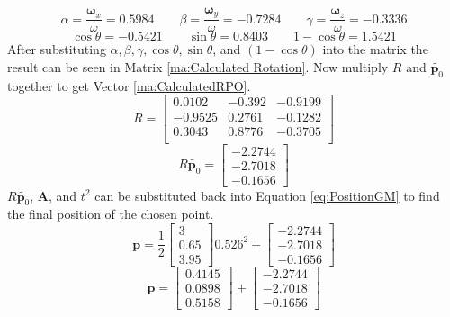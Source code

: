\begin{equation}\label{var:alphabetagamma}
	\alpha = \frac{\boldsymbol\omega_{x}}{\omega} = 0.5984
	\qquad
	\beta = \frac{\boldsymbol\omega_{y}}{\omega} = -0.7284
	\qquad
	\gamma = \frac{\boldsymbol\omega_{z}}{\omega} = -0.3336
\end{equation}
\begin{equation}\label{var:cs1-c}
	\cos\theta = -0.5421
	\qquad
	\sin\theta = 0.8403
	\qquad
	1-\cos\theta = 1.5421
\end{equation}
After substituting $\alpha, \beta, \gamma,\cos\theta, \sin\theta$, and $(1-\cos\theta)$ into the matrix the result can be seen in Matrix \ref{ma:Calculated Rotation}. Now multiply $R$ and $\tilde{\mathbf{p}_{0}}$ together to get Vector \ref{ma:CalculatedRPO}.
\begin{equation}\label{ma:Calculated Rotation}
	R = 
		\begin{bmatrix}
		   0.0102 & 
		  -0.392 & 
		  -0.9199 \\
		  
		  -0.9525 & 
		   0.2761 & 
		  -0.1282 \\
		  
		   0.3043 & 
		   0.8776 & 
		  -0.3705 \\
	\end{bmatrix}
\end{equation}
\begin{equation}\label{ma:CalculatedRPO}
	R\tilde{\mathbf{p}_{0}} = 
	\begin{bmatrix}
		 -2.2744 \\
		 -2.7018 \\
		 -0.1656 
	\end{bmatrix}
\end{equation}
$R\tilde{\mathbf{p}_{0}}$, $\mathbf{A}$, and $t^{2}$ can be substituted back into Equation \ref{eq:PositionGM} to find the final position of the chosen point.
\begin{equation}\label{eq:workout}
	\mathbf{p}=\frac{1}{2}
	\begin{bmatrix}
		 3  \\
		 0.65 \\
		 3.95 
	\end{bmatrix}
	0.526^{2}+
	\begin{bmatrix}
		 -2.2744 \\
 		 -2.7018 \\
 		 -0.1656 
	\end{bmatrix}
\end{equation}
\begin{equation}\label{eq:working2}
	\mathbf{p}=
	\begin{bmatrix}
		 0.4145  \\
		 0.0898  \\
		 0.5158 
	\end{bmatrix}
	+
	\begin{bmatrix}
		-2.2744 \\
 		-2.7018 \\
 		-0.1656 
	\end{bmatrix}
\end{equation}
